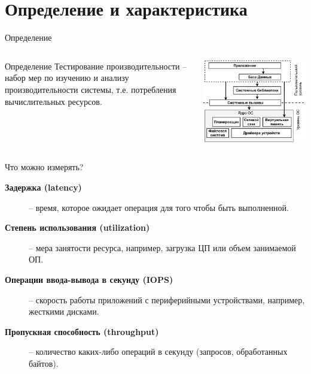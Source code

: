 \section{Определение и характеристика}

\begin{frame}{Определение}
	\begin{columns}
		\begin{column}{.5\textwidth}
			\begin{definition}{Определение}
				Тестирование производительности -- набор мер по изучению и анализу производительности системы, т.е. потребления вычислительных ресурсов.
			\end{definition}
		\end{column}
		\begin{column}{.5\textwidth}
			\includegraphics[width=\textwidth]{img/system_stack.png}
		\end{column}
	\end{columns}
\end{frame}

\begin{frame}{Что можно измерять?}
	\begin{description}
		\item[\textbf{Задержка (latency)}] -- время, которое ожидает операция для того чтобы быть выполненной.
		\item[\textbf{Степень использования (utilization)}] -- мера занятости ресурса, например, загрузка ЦП или объем занимаемой ОП.
		\item[\textbf{Операции ввода-вывода в секунду (IOPS)}] -- скорость работы приложений с периферийными устройствами, например, жесткими дисками.
		\item[\textbf{Пропускная способность (throughput)}]  -- количество каких-либо операций в секунду (запросов, обработанных байтов).
	\end{description}
\end{frame}

